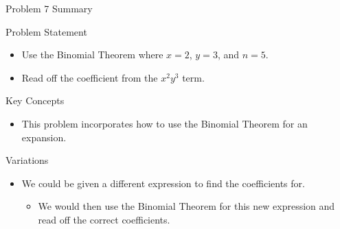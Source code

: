 \begin{summary}{Problem 7 Summary}
    \begin{statement}{Problem Statement}
        \begin{itemize}
            \item Use the Binomial Theorem where $x = 2$, $y = 3$, and $n = 5$.
            \item Read off the coefficient from the $x^{2}y^{3}$ term.
        \end{itemize}
    \end{statement}
    \begin{statement}{Key Concepts}
        \begin{itemize}
            \item This problem incorporates how to use the Binomial Theorem for an expansion.
        \end{itemize}
    \end{statement}
    \begin{statement}{Variations}
        \begin{itemize}
            \item We could be given a different expression to find the coefficients for.
            \begin{itemize}
                \item We would then use the Binomial Theorem for this new expression and read off the correct coefficients.
            \end{itemize}
        \end{itemize}
    \end{statement}
\end{summary}

